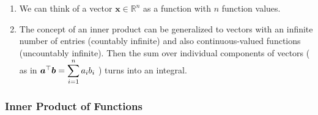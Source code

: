 \begin{enumerate}
    \item We can think of a vector $\bm{x} \in \mathbb{R}^n$ as a function with $n$ function values.
    \hfill \cite{mfml/book/mml/Deisenroth-Faisal-Ong}

    \item The concept of an inner product can be generalized to vectors with an infinite number of entries (countably infinite) and also continuous-valued functions (uncountably infinite).
    Then the sum over individual components of vectors ( as in $\bm{a}^\top \bm{b} = \displaystyle\sum^n_{i=1} a_i b_i$ ) turns into an integral.
    \hfill \cite{mfml/book/mml/Deisenroth-Faisal-Ong}

    
\end{enumerate}




\subsubsection{Inner Product of Functions}


